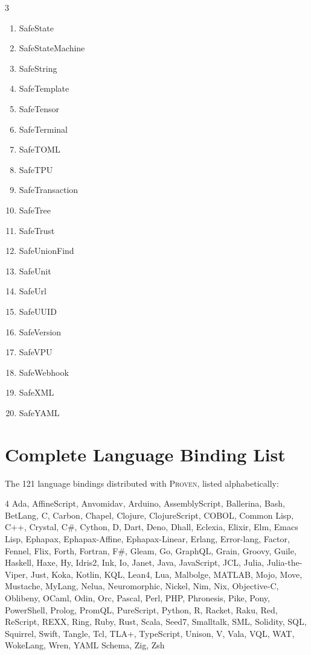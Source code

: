 \documentclass[11pt,a4paper]{article}
\newcommand{\proven}{\textsc{Proven}}
\begin{document}
\begin{multicols}{3}
\begin{enumerate}[nosep,label=\arabic*.]
\item SafeState
\item SafeStateMachine
\item SafeString
\item SafeTemplate
\item SafeTensor
\item SafeTerminal
\item SafeTOML
\item SafeTPU
\item SafeTransaction
\item SafeTree
\item SafeTrust
\item SafeUnionFind
\item SafeUnit
\item SafeUrl
\item SafeUUID
\item SafeVersion
\item SafeVPU
\item SafeWebhook
\item SafeXML
\item SafeYAML
\end{enumerate}
\end{multicols}


\section{Complete Language Binding List}
\label{sec:binding-list}

The 121 language bindings distributed with \proven{}, listed
alphabetically:

\begin{multicols}{4}
\small
\noindent
Ada,
AffineScript,
Anvomidav,
Arduino,
AssemblyScript,
Ballerina,
Bash,
BetLang,
C,
Carbon,
Chapel,
Clojure,
ClojureScript,
COBOL,
Common Lisp,
C++,
Crystal,
C\#,
Cython,
D,
Dart,
Deno,
Dhall,
Eclexia,
Elixir,
Elm,
Emacs Lisp,
Ephapax,
Ephapax-Affine,
Ephapax-Linear,
Erlang,
Error-lang,
Factor,
Fennel,
Flix,
Forth,
Fortran,
F\#,
Gleam,
Go,
GraphQL,
Grain,
Groovy,
Guile,
Haskell,
Haxe,
Hy,
Idris2,
Ink,
Io,
Janet,
Java,
JavaScript,
JCL,
Julia,
Julia-the-Viper,
Just,
Koka,
Kotlin,
KQL,
Lean4,
Lua,
Malbolge,
MATLAB,
Mojo,
Move,
Mustache,
MyLang,
Nelua,
Neuromorphic,
Nickel,
Nim,
Nix,
Objective-C,
Oblibeny,
OCaml,
Odin,
Orc,
Pascal,
Perl,
PHP,
Phronesis,
Pike,
Pony,
PowerShell,
Prolog,
PromQL,
PureScript,
Python,
R,
Racket,
Raku,
Red,
ReScript,
REXX,
Ring,
Ruby,
Rust,
Scala,
Seed7,
Smalltalk,
SML,
Solidity,
SQL,
Squirrel,
Swift,
Tangle,
Tcl,
TLA+,
TypeScript,
Unison,
V,
Vala,
VQL,
WAT,
WokeLang,
Wren,
YAML Schema,
Zig,
Zsh
\end{multicols}
\end{document}
